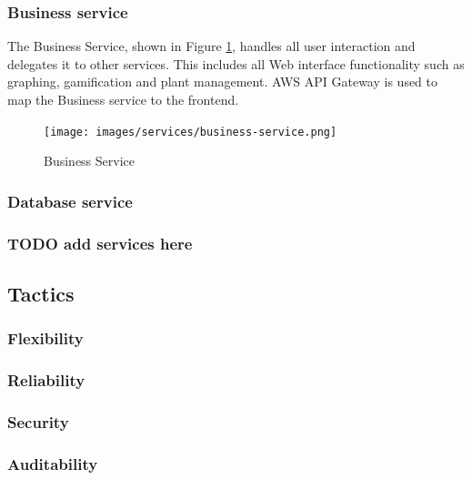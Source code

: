 \documentclass{article}
\begin{document}
\subsubsection{Business service}
The Business Service, shown in Figure \ref{fig:business-service}, handles all user interaction and delegates it to other services. This includes all Web interface functionality such as graphing, gamification and plant management. AWS API Gateway is used to map the Business service to the frontend.

\begin{figure}[h!]
  \texttt{[image: images/services/business-service.png]}
  \caption{Business Service}
  \label{fig:business-service}
\end{figure}

\subsubsection{Database service} \label{sec:database-service}


\subsubsection{TODO add services here}

\subsection{Tactics}

\subsubsection{Flexibility}

\subsubsection{Reliability}

\subsubsection{Security}

\subsubsection{Auditability}
\end{document}
